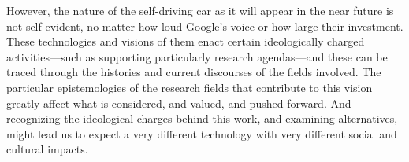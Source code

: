 

However, the nature of the self-driving car as it will appear in
the near future is not self-evident, no matter how loud Google's voice
or how large their investment. These technologies and visions of them
enact certain ideologically charged activities---such as supporting
particularly research agendas---and these can be traced through the
histories and current discourses of the fields involved.
The particular epistemologies of the research fields that contribute
to this vision greatly affect what is considered, and valued, and
pushed forward. And recognizing the ideological charges behind this
work, and examining alternatives, might lead us to expect a very
different technology with very
different social and cultural impacts. 



